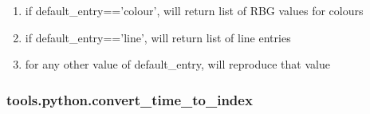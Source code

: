 \documentclass[letterpaper,10pt,english]{sphinxmanual}
\begin{document}
\begin{fulllineitems}
\begin{description}
\begin{enumerate}
\item {} 
\sphinxAtStartPar
if default\_entry==’colour’, will return list of RBG values for colours

\item {} 
\sphinxAtStartPar
if default\_entry==’line’, will return list of line entries

\item {} 
\sphinxAtStartPar
for any other value of default\_entry, will reproduce that value

\end{enumerate}

\end{description}

\end{fulllineitems}



\subsubsection{tools.python.convert\_time\_to\_index}
\label{\detokenize{_autosummary/tools.python.convert_time_to_index:tools-python-convert-time-to-index}}\label{\detokenize{_autosummary/tools.python.convert_time_to_index::doc}}
\end{document}
